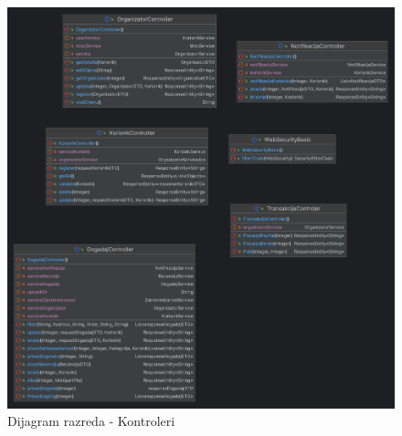 			\begin{figure}[H]
				\includegraphics[scale=0.2]{dijagramiKlasa/kontroleri.png} %
				\centering
				\caption{Dijagram razreda - Kontroleri}
				\label{fig:promjene}
			\end{figure}
			
